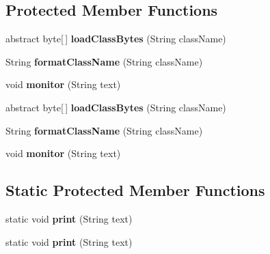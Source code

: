 \subsection*{Protected Member Functions}
\begin{DoxyCompactItemize}
\item 
\hypertarget{class_c_a_s_u_a_l_1_1misc_1_1_multi_class_loader_a06b1ad453366a04c4b785c2036c23ec0}{abstract byte\mbox{[}$\,$\mbox{]} {\bfseries load\-Class\-Bytes} (String class\-Name)}\label{class_c_a_s_u_a_l_1_1misc_1_1_multi_class_loader_a06b1ad453366a04c4b785c2036c23ec0}

\item 
\hypertarget{class_c_a_s_u_a_l_1_1misc_1_1_multi_class_loader_a05e6b596f3d83bab5137a99524a289a2}{String {\bfseries format\-Class\-Name} (String class\-Name)}\label{class_c_a_s_u_a_l_1_1misc_1_1_multi_class_loader_a05e6b596f3d83bab5137a99524a289a2}

\item 
\hypertarget{class_c_a_s_u_a_l_1_1misc_1_1_multi_class_loader_a182e8bd0d9dc85be69bfb35e10182304}{void {\bfseries monitor} (String text)}\label{class_c_a_s_u_a_l_1_1misc_1_1_multi_class_loader_a182e8bd0d9dc85be69bfb35e10182304}

\item 
\hypertarget{class_c_a_s_u_a_l_1_1misc_1_1_multi_class_loader_a06b1ad453366a04c4b785c2036c23ec0}{abstract byte\mbox{[}$\,$\mbox{]} {\bfseries load\-Class\-Bytes} (String class\-Name)}\label{class_c_a_s_u_a_l_1_1misc_1_1_multi_class_loader_a06b1ad453366a04c4b785c2036c23ec0}

\item 
\hypertarget{class_c_a_s_u_a_l_1_1misc_1_1_multi_class_loader_a05e6b596f3d83bab5137a99524a289a2}{String {\bfseries format\-Class\-Name} (String class\-Name)}\label{class_c_a_s_u_a_l_1_1misc_1_1_multi_class_loader_a05e6b596f3d83bab5137a99524a289a2}

\item 
\hypertarget{class_c_a_s_u_a_l_1_1misc_1_1_multi_class_loader_a182e8bd0d9dc85be69bfb35e10182304}{void {\bfseries monitor} (String text)}\label{class_c_a_s_u_a_l_1_1misc_1_1_multi_class_loader_a182e8bd0d9dc85be69bfb35e10182304}

\end{DoxyCompactItemize}
\subsection*{Static Protected Member Functions}
\begin{DoxyCompactItemize}
\item 
\hypertarget{class_c_a_s_u_a_l_1_1misc_1_1_multi_class_loader_ac7c710478ced9e94603273414d542b47}{static void {\bfseries print} (String text)}\label{class_c_a_s_u_a_l_1_1misc_1_1_multi_class_loader_ac7c710478ced9e94603273414d542b47}

\item 
\hypertarget{class_c_a_s_u_a_l_1_1misc_1_1_multi_class_loader_ac7c710478ced9e94603273414d542b47}{static void {\bfseries print} (String text)}\label{class_c_a_s_u_a_l_1_1misc_1_1_multi_class_loader_ac7c710478ced9e94603273414d542b47}

\end{DoxyCompactItemize}
